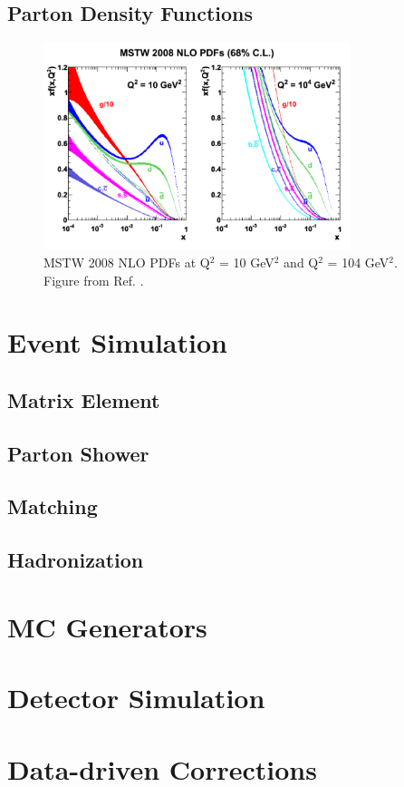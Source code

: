 \subsection{Parton Density Functions}

\begin{figure}[h]
\begin{center}
    \includegraphics[width=0.8\textwidth]{figures/simul/pdf}
\end{center}
 \caption{MSTW 2008 NLO PDFs at Q$^2$ = 10 GeV$^2$ and Q$^2$ = 104 GeV$^2$. Figure from Ref. \cite{Martin:2009iq}.}
  \label{fig:sim:pp}
\end{figure}


\section{Event Simulation}
\label{sec:eventsimul}

\subsection{Matrix Element}

\subsection{Parton Shower}

\subsection{Matching}

\subsection{Hadronization}

\section{MC Generators}

\section{Detector Simulation}

\section{Data-driven Corrections}
